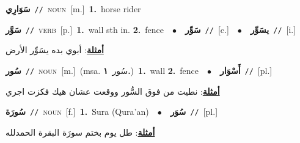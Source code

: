 \documentclass[10pt,a4paper,twoside]{article} %
\begin{document}
\begin{multicols}{2}
{\setlength\topsep{0pt}\textbf{\foreignlanguage{arabic}{سَوَارِي}}\ {\color{gray}\texttt{//}\color{black}}\ \textsc{noun}\ [m.]\ \textbf{1.}~horse rider\ } \vspace{2mm}

{\setlength\topsep{0pt}\textbf{\foreignlanguage{arabic}{سَوَّر}}\ {\color{gray}\texttt{//}\color{black}}\ \textsc{verb}\ [p.]\ \textbf{1.}~wall sth in.  \textbf{2.}~fence\ \ $\bullet$\ \ \setlength\topsep{0pt}\textbf{\foreignlanguage{arabic}{سَوِّر}}\ {\color{gray}\texttt{//}\color{black}}\ [c.]\ \ $\bullet$\ \ \setlength\topsep{0pt}\textbf{\foreignlanguage{arabic}{يسَوِّر}}\ {\color{gray}\texttt{//}\color{black}}\ [i.]\  \begin{flushright}\color{gray}\foreignlanguage{arabic}{\textbf{\underline{\foreignlanguage{arabic}{أمثلة}}}: أبوي بده يسَوِّر الأرض}\end{flushright}\color{black}} \vspace{2mm}

{\setlength\topsep{0pt}\textbf{\foreignlanguage{arabic}{سُور}}\ {\color{gray}\texttt{//}\color{black}}\ \textsc{noun}\ [m.]\ \color{gray}(msa. \foreignlanguage{arabic}{سُور}~\foreignlanguage{arabic}{\textbf{١.}})\color{black}\ \textbf{1.}~wall  \textbf{2.}~fence\ \ $\bullet$\ \ \setlength\topsep{0pt}\textbf{\foreignlanguage{arabic}{أَسْوَار}}\ {\color{gray}\texttt{//}\color{black}}\ [pl.]\  \begin{flushright}\color{gray}\foreignlanguage{arabic}{\textbf{\underline{\foreignlanguage{arabic}{أمثلة}}}: نطيت من فوق السُّور ووقعت عشان هيك فكزت اجري}\end{flushright}\color{black}} \vspace{2mm}

{\setlength\topsep{0pt}\textbf{\foreignlanguage{arabic}{سُورَة}}\ {\color{gray}\texttt{//}\color{black}}\ \textsc{noun}\ [f.]\ \textbf{1.}~Sura (Qura'an)\ \ $\bullet$\ \ \setlength\topsep{0pt}\textbf{\foreignlanguage{arabic}{سُوَر}}\ {\color{gray}\texttt{//}\color{black}}\ [pl.]\  \begin{flushright}\color{gray}\foreignlanguage{arabic}{\textbf{\underline{\foreignlanguage{arabic}{أمثلة}}}: طل يوم بختم سورَة البقرة الحمدلله}\end{flushright}\color{black}} \vspace{2mm}


\end{multicols}
\end{document}
